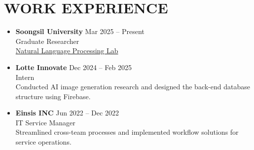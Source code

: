 \documentclass[10pt,a4paper]{article}
\newcommand{\seclabel}[1]{\section*{\uppercase{#1}}}
\newcommand{\cvitem}[2]{\textbf{#1} \hfill \small{#2}\\}
\begin{document}
\seclabel{Work Experience}
\begin{itemize}
    \item \cvitem{Soongsil University}{Mar 2025 -- Present}
    \small{Graduate Researcher \\
    \href{https://sites.google.com/view/ssu-nlp/home}{Natural Language Processing Lab}} \vspace{0.6em}

    \item \cvitem{Lotte Innovate}{Dec 2024 -- Feb 2025}
    \small{Intern \\
    Conducted AI image generation research and designed the back-end database structure using Firebase.} \vspace{0.6em}

    \item \cvitem{Einsis INC}{Jun 2022 -- Dec 2022}
    \small{IT Service Manager \\
    Streamlined cross-team processes and implemented workflow solutions for service operations.}
\end{itemize}
\end{document}
